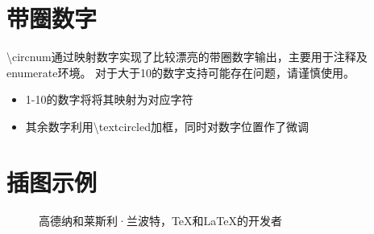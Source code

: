 \section{带圈数字}
\textbackslash circnum通过映射数字实现了比较漂亮的带圈数字输出，主要用于注释及enumerate环境。
对于大于10的数字支持可能存在问题，请谨慎使用。

\begin{itemize}
  \item 1-10的数字将将其映射为对应字符
  \item 其余数字利用\textbackslash textcircled加框，同时对数字位置作了微调
\end{itemize}

\section{插图示例}

\begin{figure}[htbp]
  \centering
  \caption{高德纳和莱斯利·兰波特，\TeX{}和\LaTeX{}的开发者}
\end{figure}

